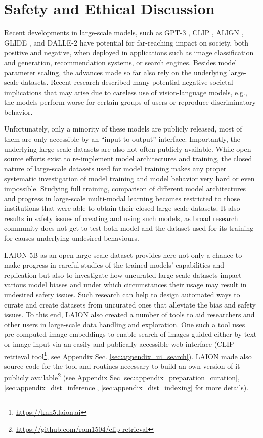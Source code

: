 \section{Safety and Ethical Discussion}
\label{sec:ethical_discussion}

Recent developments in large-scale models, such as GPT-3 \citep{GPT-3}, CLIP \citep{CLIP}, ALIGN \citep{ALIGN}, GLIDE \citep{GLIDE}, and DALLE-2 \citep{DALLE-2} have potential for far-reaching impact on society, both positive and negative, when deployed in applications such as image classification and generation, recommendation systems, or search engines. Besides model parameter scaling, the advances made so far also rely on the underlying large-scale datasets. Recent research \citep{bender2021Stochastic, birhane2021Large} described many potential negative societal implications that may arise due to careless use of vision-language models, e.g., the models perform worse for certain groups of users or reproduce discriminatory behavior. 

Unfortunately, only a minority of these models are publicly released, most of them are only accessible by an ``input to output'' interface. Importantly, the underlying large-scale datasets are also not often publicly available. While open-source efforts exist to re-implement model architectures and training, the closed nature of large-scale datasets used for model training makes any proper systematic investigation of model training and model behavior very hard or even impossible. Studying full training, comparison of different model architectures and progress in large-scale multi-modal learning becomes restricted to those institutions that were able to obtain their closed large-scale datasets. It also results in safety issues of creating and using such models, as broad research community does not get to test both model and the dataset used for its training for causes underlying undesired behaviours. 

LAION-5B as an open large-scale dataset provides here not only a chance to make progress in careful studies of the trained models' capabilities and replication but also to investigate how uncurated large-scale datasets impact various model biases and under which circumstances their usage may result in undesired safety issues. Such research can help to design automated ways to curate and create datasets from uncurated ones that alleviate the bias and safety issues. To this end, LAION also created a number of tools to aid researchers and other users in large-scale data handling and exploration. One such a tool uses pre-computed image embeddings to enable search of images guided either by text or image input via an easily and publically accessible web interface (CLIP retrieval tool\footnote{\href{https://knn5.laion.ai}{https://knn5.laion.ai}}, see Appendix Sec. \ref{sec:appendix_ui_search}). LAION made also source code for the tool and routines necessary to build an own version of it publicly available\footnote{\href{https://github.com/rom1504/clip-retrieval}{https://github.com/rom1504/clip-retrieval}} (see Appendix Sec \ref{sec:appendix_preparation_curation}, \ref{sec:appendix_dist_inference}, \ref{sec:appendix_dist_indexing} for more details).


